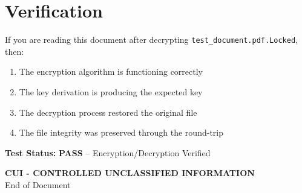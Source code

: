 \documentclass[11pt,letterpaper]{article}
\begin{document}
\section*{Verification}

If you are reading this document after decrypting \texttt{test\_document.pdf.Locked}, then:

\begin{enumerate}
    \item The encryption algorithm is functioning correctly
    \item The key derivation is producing the expected key
    \item The decryption process restored the original file
    \item The file integrity was preserved through the round-trip
\end{enumerate}

\textbf{Test Status:} \colorbox{green!30}{\textbf{PASS}} -- Encryption/Decryption Verified

\vspace{0.5in}
\begin{center}
\colorbox{yellow!30}{\parbox{0.95\textwidth}{\centering\textbf{CUI - CONTROLLED UNCLASSIFIED INFORMATION}\\
\small End of Document}}
\end{center}
\end{document}
